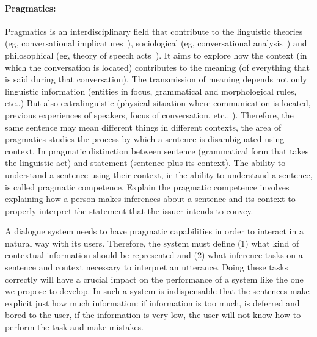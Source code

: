 \paragraph{Pragmatics:} Pragmatics is an interdisciplinary field that contribute
to the linguistic theories (eg, conversational implicatures~\cite{grice75}),
sociological (eg, conversational analysis~\cite{schegloff87b}) and philosophical
(eg, theory of speech acts~\cite{austin62}). It aims to explore how the context
(in which the conversation is located) contributes to the meaning (of everything
that is said during that conversation). The transmission of meaning depends not
only linguistic information (entities in focus, grammatical and morphological
rules, etc..) But also extralinguistic (physical situation where communication
is located, previous experiences of speakers, focus of conversation, etc.. ).
Therefore, the same sentence may mean different things in different contexts,
the area of pragmatics studies the process by which a sentence is disambiguated
using context. In pragmatic distinction between sentence (grammatical form that
takes the linguistic act) and statement (sentence plus its context). The ability
to understand a sentence using their context, ie the ability to understand a
sentence, is called pragmatic competence. Explain the pragmatic competence
involves explaining how a person makes inferences about a sentence and its
context to properly interpret the statement that the issuer intends to convey.
% 

A dialogue system needs to have pragmatic capabilities in order to interact in a
natural way with its users. Therefore, the system must define (1) what kind of
contextual information should be represented and (2) what inference tasks on a
sentence and context necessary to interpret an utterance. Doing these
tasks correctly will have a crucial impact on the performance of a system like
the one we propose to develop. In such a system is indispensable that the
sentences make explicit just how much information: if information is too much,
is deferred and bored to the user, if the information is very low, the user will
not know how to perform the task and make mistakes.

